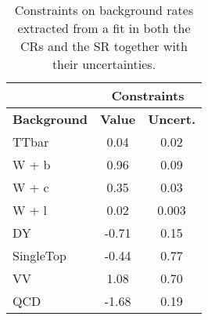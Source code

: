 \documentclass[10pt]{article}
\begin{document}
\begin{table}[!ht]
\begin{center}
\begin{tabular}{|l|c|c|}
\hline
\hline
& \multicolumn{2}{c|}{\textbf{Constraints}} \\
\hline
\hline
\textbf{Background} & \textbf{ Value} & \textbf{Uncert.} \\
\hline
TTbar            & 0.04  & 0.02    \\
W + b            & 0.96  & 0.09    \\
W + c            & 0.35  & 0.03    \\
W + l            & 0.02  & 0.003   \\
DY               & -0.71 & 0.15    \\
SingleTop        & -0.44 & 0.77    \\
VV               & 1.08  & 0.70    \\
QCD              & -1.68 & 0.19    \\
\hline
\hline

\hline
\hline
\end{tabular}
\caption{Constraints on background rates extracted from a fit in both the CRs and the SR together with their uncertainties.}
\label{tab:SFtable}
\end{center}
\end{table} 
\end{document}
